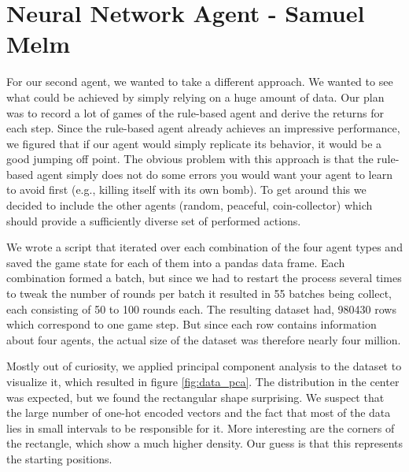 \documentclass{article}
\begin{document}
\section[Neural Network Agent]{Neural Network Agent {\small - Samuel Melm}} \label{sec:nn_agent}

For our second agent, we wanted to take a different approach. We wanted to see what could be achieved by simply relying on a huge amount of data. Our plan was to record a lot of games of the rule-based agent and derive the returns for each step. Since the rule-based agent already achieves an impressive performance, we figured that if our agent would simply replicate its behavior, it would be a good jumping off point. The obvious problem with this approach is that the rule-based agent simply does not do some errors you would want your agent to learn to avoid first (e.g., killing itself with its own bomb). To get around this we decided to include the other agents (random, peaceful, coin-collector) which should provide a sufficiently diverse set of performed actions. 

We wrote a script that iterated over each combination of the four agent types and saved the game state for each of them into a pandas data frame. Each combination formed a batch, but since we had to restart the process several times to tweak the number of rounds per batch it resulted in 55 batches being collect, each consisting of 50 to 100 rounds each. The resulting dataset had, 980430 rows which correspond to one game step. But since each row contains information about four agents, the actual size of the dataset was therefore nearly four million.

Mostly out of curiosity, we applied principal component analysis to the dataset to visualize it, which resulted in figure \ref{fig:data_pca}. The distribution in the center was expected, but we found the rectangular shape surprising. We suspect that the large number of one-hot encoded vectors and the fact that most of the data lies in small intervals to be responsible for it. More interesting are the corners of the rectangle, which show a much higher density. Our guess is that this represents the starting positions. 
\end{document}

